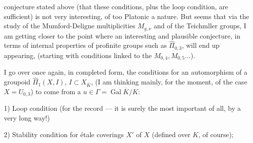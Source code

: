 conjecture stated above (that these conditions, plus the loop condition,  are sufficient) is not very interesting, of too Platonic a nature. But   seems  that via the study of the Mumford-Deligne multiplicities $M_{g,\nu}$ and of the Teichmller groups, I am getting closer to the point where an interesting and plausible conjecture, in terms of internal properties of profinite groups such as $\widehat{\Pi}_{0,3}$, will end up appearing, (starting with conditions linked to the $M_{0,4},M_{0,5}\ldots$).

I go over once again, in completed form, the conditions for an automorphism \inserted{$\Theta$} of a groupoid $\widehat{\Pi}_1(X,I)$, $I\subset X_{\overline{K}}$,  (I am thinking mainly, for the moment, of the case $X=U_{0,3}$) to come from a $u\in\Gamma=\operatorname{Gal}\overline{K}/K$:

1) Loop condition (for the record --- it is surely the most important of all, by a very long way!)

2) Stability condition for étale coverings  $X'$ of $X$ (defined over $K$, of course);
